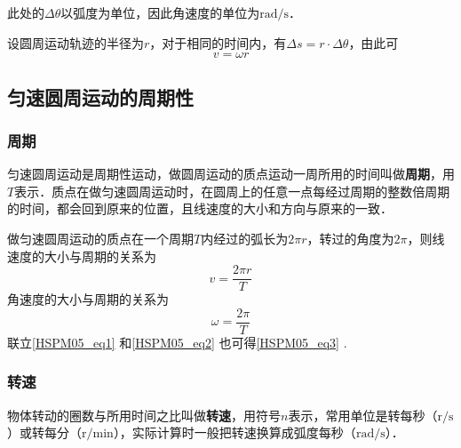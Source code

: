 此处的$\Delta \theta$以弧度为单位，因此角速度的单位为$\mathrm{rad/s}$．

设圆周运动轨迹的半径为$r$，对于相同的时间内，有$\Delta s=r \cdot \Delta \theta$，由此可
\begin{equation}\label{HSPM05_eq3}
v=\omega r
\end{equation}

\subsection{匀速圆周运动的周期性}

\subsubsection{周期}

匀速圆周运动是周期性运动，做圆周运动的质点运动一周所用的时间叫做\textbf{周期}，用$T$表示．质点在做匀速圆周运动时，在圆周上的任意一点每经过周期的整数倍周期的时间，都会回到原来的位置，且线速度的大小和方向与原来的一致．

做匀速圆周运动的质点在一个周期$T$内经过的弧长为$2\pi r$，转过的角度为$2\pi$，则线速度的大小与周期的关系为
\begin{equation}\label{HSPM05_eq1}
v=\frac{2\pi r}{T}
\end{equation}
角速度的大小与周期的关系为
\begin{equation}\label{HSPM05_eq2}
\omega = \frac{2\pi}{T}
\end{equation}
联立\autoref{HSPM05_eq1} 和\autoref{HSPM05_eq2} 也可得\autoref{HSPM05_eq3} .

\subsubsection{转速}

物体转动的圈数与所用时间之比叫做\textbf{转速}，用符号$n$表示，常用单位是转每秒（$\mathrm{r/s}$）或转每分（$\mathrm{r/min}$），实际计算时一般把转速换算成弧度每秒（$\mathrm{rad/s}$）．
